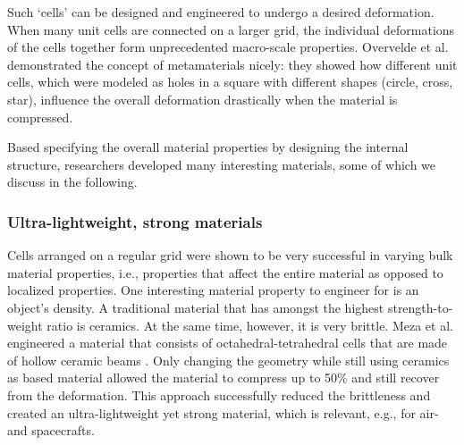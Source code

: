 {%


Such `cells' can be designed and engineered to undergo a desired deformation. When many unit cells are connected on a larger grid, the individual deformations of the cells together form unprecedented macro-scale properties. Overvelde et al. \cite{Overvelde2012a, Overvelde2014} demonstrated the concept of metamaterials nicely: they showed how different unit cells, which were modeled as holes in a square with different shapes (circle, cross, star), influence the overall deformation drastically when the material is compressed. 



Based specifying the overall material properties by designing the internal structure, researchers developed many interesting materials, some of which we discuss in the following.

\subsubsection{Ultra-lightweight, strong materials} %
Cells arranged on a regular grid were shown to be very successful in varying bulk material properties, i.e., properties that affect the entire material as opposed to localized properties. One interesting material property to engineer for is an object's density. A traditional material that has amongst the highest strength-to-weight ratio is ceramics. At the same time, however, it is very brittle. Meza et al. engineered a material that consists of octahedral-tetrahedral cells that are made of hollow ceramic beams \cite{Meza2014, Meza2014a, Montemayor2014, Zheng2014}. Only changing the geometry while still using ceramics as based material allowed the material to compress up to 50\% and still recover from the deformation. This approach successfully reduced the brittleness and created an ultra-lightweight yet strong material, which is relevant, e.g., for air- and spacecrafts. 

}
